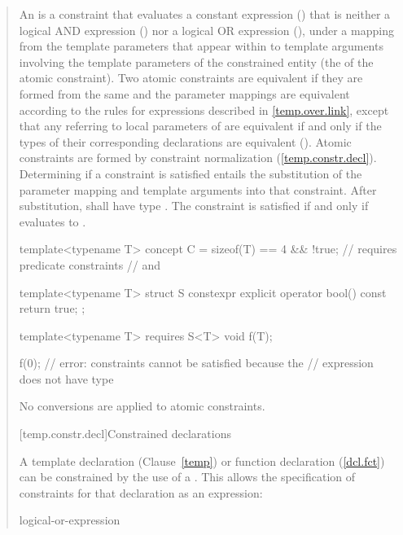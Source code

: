 \begin{quote}
\begin{addedblock}
\pnum
An  is a constraint that evaluates a constant 
expression  () that is neither a logical
AND expression () nor a logical OR expression
(), under a mapping from the template parameters
that appear within  to template arguments involving the
template parameters of the constrained entity (the  of the atomic constraint).
Two atomic constraints are equivalent if they are formed from the same
 and the parameter mappings are equivalent
according to the rules for expressions described in \ref{temp.over.link},
except that any  referring to 
local parameters of 
are equivalent if and only if the types of their corresponding
declarations are equivalent ().
% 
\enternote
Atomic constraints are formed by constraint normalization (\ref{temp.constr.decl}).
\exitnote
% 
Determining if a constraint is satisfied entails the substitution 
of the parameter mapping and template arguments into that constraint.
% 
After substitution,  shall have type .
% 
The constraint is satisfied if and only if  evaluates to 
.
% 
\enterexample
\begin{codeblock}
template<typename T> 
  concept C = sizeof(T) == 4 && !true; // requires predicate constraints
                                       //  and 

template<typename T>
  struct S {
    constexpr explicit operator bool() const { return true; }
  };

template<typename T>
  requires S<T>{}
    void f(T);

f(0); // error: constraints cannot be satisfied because the
      // expression  does not have type 
\end{codeblock}
No conversions are applied to atomic constraints.
\exitexample


[temp.constr.decl]{Constrained declarations}

\pnum
A template declaration (Clause~\ref{temp}) or function declaration 
(\ref{dcl.fct}) can be constrained by the use of a 
. 
% 
This allows the specification of constraints for that declaration as
an expression:

\begin{bnf}
\br
    logical-or-expression
\end{bnf}


\end{addedblock}
\end{quote}
